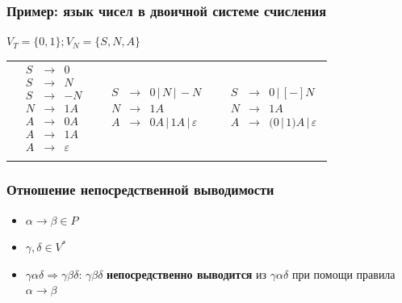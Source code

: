 \documentclass{beamer}
\begin{document}
\begin{frame}[fragile]
  \transwipe[direction=90]
  \frametitle{Пример: язык чисел в двоичной системе счисления}
$V_T = \{ 0, 1 \}; V_N = \{ S, N, A \}$

\begin{tabular}{p{3cm}  p{4cm}  p{3cm}}

$$
\begin{array}{crcl}
&S& \rightarrow & 0 \\
&S& \rightarrow & N \\
&S& \rightarrow & - N \\
&N& \rightarrow & 1 A \\
&A& \rightarrow & 0 A \\
&A& \rightarrow & 1 A \\
&A& \rightarrow & \varepsilon \\
\end{array}
$$

& \pause

$$
\begin{array}{crcl}
&S& \rightarrow & 0 \, | \, N \, | \, - N  \\
&N& \rightarrow & 1 A \\
&A& \rightarrow & 0 A \, | \, 1 A  \, | \, \varepsilon\\
\end{array}
$$

& \pause

$$
\begin{array}{crcl}
&S& \rightarrow & 0 \, | \, [-] N  \\
&N& \rightarrow & 1 A \\
&A& \rightarrow & (0 \, | \, 1) A  \, | \, \varepsilon\\
\end{array}
$$

\end{tabular}
\end{frame}

\begin{frame}[fragile]
  \transwipe[direction=90]
  \frametitle{Отношение непосредственной выводимости}
  \begin{itemize}
    \item $\alpha \rightarrow \beta \in P$
    \item $\gamma, \delta \in V^*$
    \item $\gamma \alpha \delta \Rightarrow \gamma \beta \delta$: $\gamma \beta \delta$ \textbf{непосредственно выводится} из $\gamma \alpha \delta$ при помощи правила $\alpha \rightarrow \beta$
  \end{itemize}
\end{frame}
\end{document}
